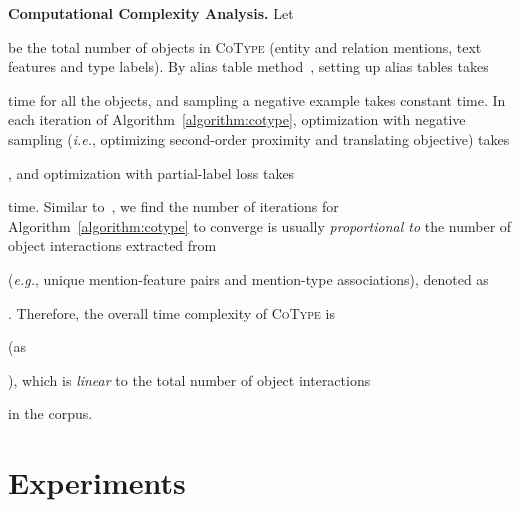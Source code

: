 \documentclass[letterpaper]{sig-alternate-2013}
\def\ie{{\sl i.e.}}
\def\eg{{\sl e.g.}}
\begin{document}
\smallskip
\noindent
\textsf{\small \textbf{Computational Complexity Analysis.}}
Let \begin{small}\end{small} be the total number of objects in \textsc{CoType} (entity and relation mentions, text features and type labels).
By alias table method~\cite{tang2015line}, setting up alias tables takes \begin{small}\end{small} time for all the objects, and sampling a negative example takes constant time. 
In each iteration of Algorithm~\ref{algorithm:cotype}, optimization with negative sampling (\ie, optimizing second-order proximity and translating objective) takes \begin{small}\end{small}, and optimization with partial-label loss takes \begin{small}\end{small} time. Similar to~\cite{tang2015line}, we find the number of iterations for Algorithm~\ref{algorithm:cotype} to converge is usually \textit{proportional to} the number of object interactions extracted from \begin{small}\end{small} (\eg, unique mention-feature pairs and mention-type associations), denoted as \begin{small}\end{small}. Therefore, the overall time complexity of \textsc{CoType} is \begin{small}\end{small} (as \begin{small}\end{small}), which is \textit{linear} to the total number of object interactions \begin{small}\end{small} in the corpus.

\section{Experiments}
\label{sec:experiments}
\end{document}
